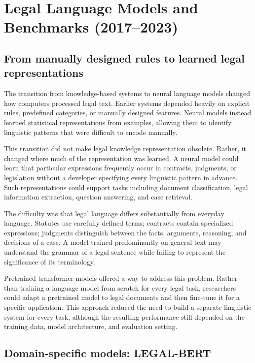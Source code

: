 \section{Legal Language Models and Benchmarks (2017--2023)}
\label{sec:lm}

\subsection{From manually designed rules to learned legal representations}

The transition from knowledge-based systems to neural language models changed how computers
processed legal text. Earlier systems depended heavily on explicit rules, predefined categories, or
manually designed features. Neural models instead learned statistical representations from examples,
allowing them to identify linguistic patterns that were difficult to encode manually.

This transition did not make legal knowledge representation obsolete. Rather, it changed where much
of the representation was learned. A neural model could learn that particular expressions frequently
occur in contracts, judgments, or legislation without a developer specifying every linguistic
pattern in advance. Such representations could support tasks including document classification,
legal information extraction, question answering, and case retrieval.

The difficulty was that legal language differs substantially from everyday language. Statutes use
carefully defined terms; contracts contain specialized expressions; judgments distinguish between
the facts, arguments, reasoning, and decisions of a case. A model trained predominantly on general
text may understand the grammar of a legal sentence while failing to represent the significance of
its terminology.

Pretrained transformer models offered a way to address this problem. Rather than training a language
model from scratch for every legal task, researchers could adapt a pretrained model to legal
documents and then fine-tune it for a specific application. This approach reduced the need to build a
separate linguistic system for every task, although the resulting performance still depended on the
training data, model architecture, and evaluation setting.

\subsection{Domain-specific models: LEGAL-BERT}

